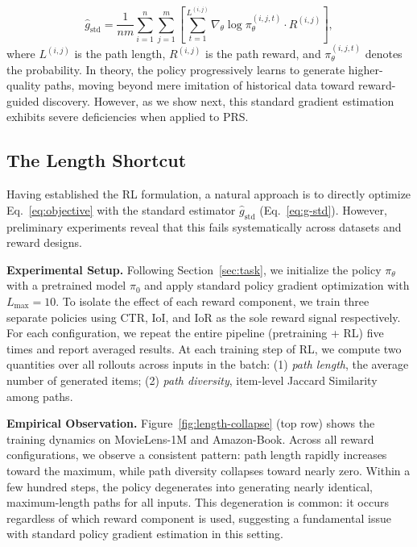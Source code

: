 \documentclass{llmxive}
\begin{document}
\begin{equation}
\hat{g}_{\mathrm{std}} = \frac{1}{nm}\sum_{i=1}^{n}\sum_{j=1}^{m}\left[\sum_{t=1}^{L^{(i,j)}} \nabla_\theta \log \pi_\theta^{(i, j, t)} \cdot R^{(i,j)}\right],
\label{eq:g-std}
\end{equation}
where $L^{(i,j)}$ is the path length, $R^{(i,j)}$ is the path reward, and $\pi_\theta^{(i, j, t)}$ denotes the probability. In theory, the policy progressively learns to generate higher-quality paths, moving beyond mere imitation of historical data toward reward-guided discovery. However, as we show next, this standard gradient estimation exhibits severe deficiencies when applied to PRS.

\subsection{The Length Shortcut}
\label{sec:analysis}
 
Having established the RL formulation, a natural approach is to directly optimize Eq.~\eqref{eq:objective} with the standard estimator $\hat{g}_{\mathrm{std}}$ (Eq.~\eqref{eq:g-std}). However, preliminary experiments reveal that this fails systematically across datasets and reward designs.
 
\textbf{Experimental Setup.} Following Section~\ref{sec:task}, we initialize the policy $\pi_\theta$ with a pretrained model $\pi_0$ and apply standard policy gradient optimization with $L_{\max}=10$. To isolate the effect of each reward component, we train three separate policies using CTR, IoI, and IoR as the sole reward signal respectively. For each configuration, we repeat the entire pipeline (pretraining + RL) five times and report averaged results. At each training step of RL, we compute two quantities over all rollouts across inputs in the batch: (1) \emph{path length}, the average number of generated items; (2) \emph{path diversity}, item-level Jaccard Similarity among paths.
 
\textbf{Empirical Observation.} Figure~\ref{fig:length-collapse} (top row) shows the training dynamics on MovieLens-1M and Amazon-Book. Across all reward configurations, we observe a consistent pattern: path length rapidly increases toward the maximum, while path diversity collapses toward nearly zero. Within a few hundred steps, the policy degenerates into generating nearly identical, maximum-length paths for all inputs. This degeneration is common: it occurs regardless of which reward component is used, suggesting a fundamental issue with standard policy gradient estimation in this setting.
 
\end{document}

